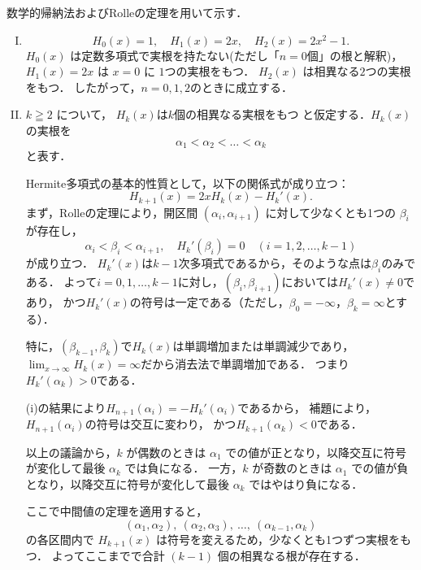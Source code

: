 \begin{tproof}
    数学的帰納法およびRolleの定理を用いて示す．
    \noindent
    \begin{enumerate}[(I)]
        \item \mbox{}
              \[
                  H_0(x) = 1, \quad H_1(x) = 2x, \quad H_2(x) = 2x^2-1.
              \]
              $H_0(x)$ は定数多項式で実根を持たない(ただし「$n=0$個」の根と解釈)，
              $H_1(x) = 2x$ は $x=0$ に $1$つの実根をもつ．
              $H_2(x)$ は相異なる$2$つの実根をもつ．
              したがって，$n=0,1,2$のときに成立する．
        \item
              $k \geqq 2$ について，
              $H_k(x)$は$k$個の相異なる実根をもつ
              と仮定する．$H_k(x)$ の実根を
              \[
                  \alpha_1 < \alpha_2 < \dots < \alpha_k
              \]
              と表す．

              Hermite多項式の基本的性質として，以下の関係式が成り立つ：
              \[
                  H_{k+1}(x)  = 2xH_k(x)-H_k'(x).
              \]
              まず，Rolleの定理により，開区間 $(\alpha_i,\alpha_{i+1})$ に対して少なくとも1つの $\beta_i$ が存在し，
              \[
                  \alpha_i < \beta_i < \alpha_{i+1},\quad
                  H_k'(\beta_i) = 0
                  \quad (i=1,2,\dots,k-1)
              \]
              が成り立つ．
              $H_k '(x)$は$k-1$次多項式であるから，そのような点は$\beta_i$のみである．
              よって$i = 0,1,\dots,k-1$に対し，$(\beta_i,\beta_{i+1})$においては$H_k '(x) \ne 0$であり，
              かつ$H_k '(x)$の符号は一定である（ただし，$ \beta_0 =-\infty$，$\beta_k = \infty$とする）．

              特に，$(\beta_{k-1},\beta_k)$で$H_k (x)$は単調増加または単調減少であり，
              $\lim_{x \to \infty} H_k (x) =\infty$だから消去法で単調増加である．
              つまり$H_k ' (\alpha_k) > 0$である．

              (i)の結果により$H_{n+1} (\alpha_i) =-H_k'(\alpha_i)$であるから，
              補題により，$H_{n+1}(\alpha_i)$の符号は交互に変わり，
              かつ$H_{k+1}(\alpha_k) < 0$である．

              以上の議論から，$k$ が偶数のときは $\alpha_1$ での値が正となり，以降交互に符号が変化して最後 $\alpha_k$ では負になる．
              一方，$k$ が奇数のときは $\alpha_1$ での値が負となり，以降交互に符号が変化して最後 $\alpha_k$ ではやはり負になる．

              ここで中間値の定理を適用すると，
              \[
                  (\alpha_1,\alpha_2),~(\alpha_2,\alpha_3),~\dots,~(\alpha_{k-1},\alpha_k)
              \]
              の各区間内で $H_{k+1}(x)$ は符号を変えるため，少なくとも1つずつ実根をもつ．
              よってここまでで合計 $(k-1)$ 個の相異なる根が存在する．


\end{enumerate}
\end{tproof}
